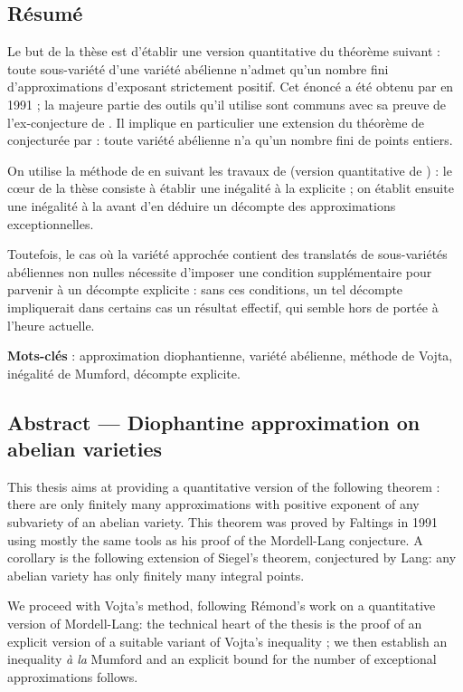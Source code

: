 \documentclass[final, cover]{mpg-preth}
\begin{document}
\thispagestyle{empty}

\subsection*{Résumé}

Le but de la thèse est d'établir une version quantitative du théorème suivant
: toute sous-variété d'une variété abélienne n'admet qu'un nombre fini
d'approximations d'exposant strictement positif. Cet énoncé a été obtenu par
 en 1991 ; la majeure partie des outils qu'il utilise sont
communs avec sa preuve de l'ex-conjecture de . Il implique
en particulier une extension du théorème de  conjecturée par
 : toute variété abélienne n'a qu'un nombre fini de points entiers.

On utilise la méthode de  en suivant les travaux de 
(version quantitative de ) : le cœur de la thèse consiste à
établir une inégalité à la  explicite ; on établit ensuite une
inégalité à la  avant d'en déduire un décompte des approximations
exceptionnelles.

Toutefois, le cas où la variété approchée contient des translatés de
sous-variétés abéliennes non nulles nécessite d'imposer une condition
supplémentaire pour parvenir à un décompte explicite : sans ces conditions,
un tel décompte impliquerait dans certains cas un résultat effectif, qui
semble hors de portée à l'heure actuelle.

\medskip\noindent
\textbf{Mots-clés} : approximation diophantienne, variété abélienne, méthode
de Vojta, inégalité de Mumford, décompte explicite.

\subsection*{Abstract --- Diophantine approximation on abelian varieties}

This thesis aims at providing a quantitative version of the following theorem :
there are only finitely many approximations with positive exponent of any
subvariety of an abelian variety. This theorem was proved by Faltings in 1991
using mostly the same tools as his proof of the Mordell-Lang conjecture. A
corollary is the following extension of Siegel's theorem, conjectured by Lang:
any abelian variety has only finitely many integral points.

We proceed with Vojta's method, following Rémond's work on a quantitative
version of Mordell-Lang: the technical heart of the thesis is the proof of an
explicit version of a suitable variant of Vojta's inequality ; we then
establish an inequality \emph{à la} Mumford and an explicit bound for the
number of exceptional approximations follows.
\end{document}
